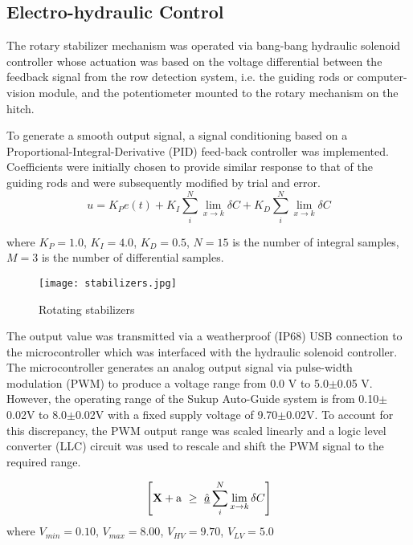 \begin{flushleft}
\begin{flushleft}
\subsection{Electro-hydraulic Control}
The rotary stabilizer mechanism was operated via bang-bang hydraulic
solenoid controller whose actuation was based on the voltage
differential between the feedback signal from the row detection
system, i.e. the guiding rods or computer-vision module, and the
potentiometer mounted to the rotary mechanism on the hitch.

To generate a smooth output signal, a signal conditioning based on a
Proportional-Integral-Derivative (PID) feed-back controller was
implemented. Coefficients were initially chosen to provide similar
response to that of the guiding rods and were subsequently modified by
trial and error.
\begin{equation}
    u = K_{P}e(t) + K_{I}\sum_i^N \lim_{x \rightarrow k} \delta C + K_{D}\sum_i^N \lim_{x \rightarrow k} \delta C
  \label{eq:pid}
\end{equation}
\begin{flushleft}
where $K_{P}=1.0$, $K_{I}=4.0$, $K_{D}=0.5$, $N=15$ is the number of integral samples,
$M=3$ is the number of differential samples.
\end{flushleft}

\begin{figure}
  \centering
  \texttt{[image: stabilizers.jpg]}
  \caption{Rotating stabilizers}
  \label{fig:stabilizers}
\end{figure}

The output value was transmitted via a weatherproof (IP68) USB
connection to the microcontroller which was interfaced with the
hydraulic solenoid controller. The microcontroller generates an analog
output signal via pulse-width modulation (PWM) to produce a voltage
range from 0.0 V to 5.0$\pm$0.05 V. However, the operating range of the
Sukup Auto-Guide system is from 0.10$\pm$0.02V to 8.0$\pm$0.02V with a fixed
supply voltage of 9.70$\pm$0.02V. To account for this discrepancy, the PWM
output range was scaled linearly and a logic level converter (LLC)
circuit was used to rescale and shift the PWM signal to the required
range.

\begin{equation}
  \left[
    {\bf X} + {\rm a} \ \geq\ 
    \underline{\hat a} \sum_i^N \lim_{x \rightarrow k} \delta C
  \right]
  \label{eq:v_out}
\end{equation}
where $V_{min}=0.10$, $V_{max}=8.00$, $V_{HV}=9.70$, $V_{LV}=5.0$


\end{flushleft}
\end{flushleft}
